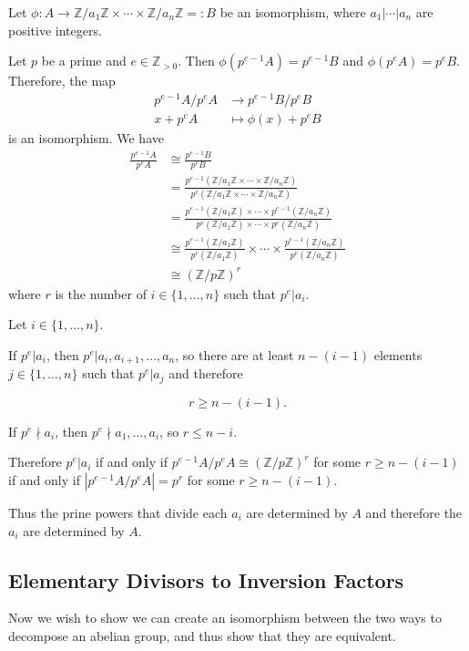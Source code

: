 \documentclass{article}
\begin{document}
Let $\phi: A \rightarrow \mathbb{Z}/a_1\mathbb{Z} \times \cdots \times \mathbb{Z}/a_n\mathbb{Z} =: B$ be an isomorphism, where $a_1|\cdots | a_n$ are positive integers.

Let $p$ be a prime and $e\in \mathbb{Z}_{>0}$. Then $\phi(p^{e-1}A)=p^{e-1}B$ and $\phi(p^eA)=p^eB$. Therefore, the map
\begin{align*}
    p^{e-1}A/p^eA &\rightarrow p^{e-1}B/p^eB \\ 
    x+p^eA &\mapsto \phi(x) + p^eB
\end{align*}
is an isomorphism. We have
\begin{align*}
    \frac{p^{e-1}A}{p^eA} &\cong \frac{p^{e-1}B}{p^eB} \\ 
    &= \frac{p^{e-1}(\mathbb{Z}/a_1\mathbb{Z} \times \cdots \times \mathbb{Z}/a_n\mathbb{Z})}{p^e(\mathbb{Z}/a_1\mathbb{Z} \times \cdots \times \mathbb{Z}/a_n \mathbb{Z})} \\ 
    &= \frac{p^{e-1}(\mathbb{Z}/a_1\mathbb{Z})\times \cdots \times p^{e-1}(\mathbb{Z}/a_n\mathbb{Z})}{p^e(\mathbb{Z}/a_1\mathbb{Z})\times \cdots \times p^e(\mathbb{Z}/a_n\mathbb{Z})} \\ 
    &\cong \frac{p^{e-1}(\mathbb{Z}/a_1\mathbb{Z})}{p^e(\mathbb{Z}/a_1\mathbb{Z})} \times \cdots \times \frac{p^{e-1}(\mathbb{Z}/a_n\mathbb{Z})}{p^e(\mathbb{Z}/a_n\mathbb{Z})} \\ 
    &\cong (\mathbb{Z}/p\mathbb{Z})^r
\end{align*}
where $r$ is the number of $i\in \{1,\dots,n\}$ such that $p^e | a_i$.

Let $i\in \{1,\dots,n\}$.

If $p^e | a_i$, then $p^e | a_i, a_{i+1},\dots, a_n$, so there are at least $n-(i-1)$ elements $j\in \{1,\dots,n\}$ such that $p^e | a_j$ and therefore 

$$r \ge n - (i-1).$$

If $p^e \nmid a_i$, then $p^e \nmid a_1,\dots, a_i$, so $r \le n-i$.

Therefore $p^e| a_i$ if and only if $p^{e-1}A/p^eA \cong (\mathbb{Z}/p\mathbb{Z})^r$ for some $r \ge n-(i-1)$ if and only if $|p^{e-1}A/p^eA| = p^r$ for some $r \ge n-(i-1)$.

Thus the prine powers that divide each $a_i$ are determined by $A$ and therefore the $a_i$ are determined by $A$.
\subsection{Elementary Divisors to Inversion Factors}
Now we wish to show we can create an isomorphism between the two ways to decompose an abelian group, and thus show that they are equivalent.
\end{document}
